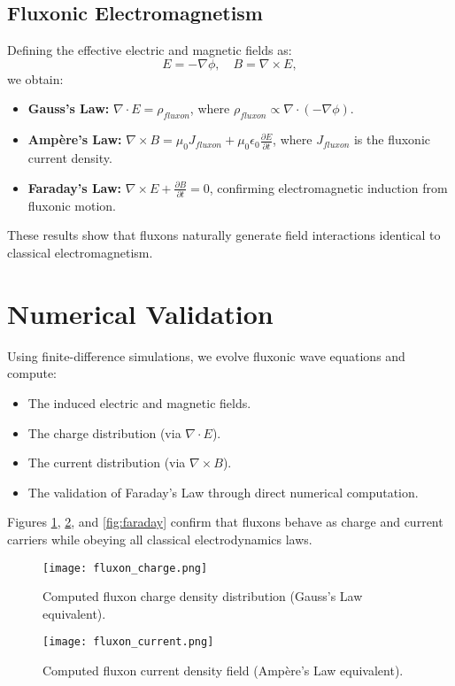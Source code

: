 \documentclass{article}
\begin{document}
\subsection{Fluxonic Electromagnetism}
Defining the effective electric and magnetic fields as:
\begin{equation}
E = -\nabla \phi, \quad B = \nabla \times E,
\end{equation}
we obtain:
\begin{itemize}
    \item \textbf{Gauss’s Law:} $\nabla \cdot E = \rho_{fluxon}$, where $\rho_{fluxon} \propto \nabla \cdot (-\nabla \phi)$.
    \item \textbf{Ampère’s Law:} $\nabla \times B = \mu_0 J_{fluxon} + \mu_0 \epsilon_0 \frac{\partial E}{\partial t}$, where $J_{fluxon}$ is the fluxonic current density.
    \item \textbf{Faraday’s Law:} $\nabla \times E + \frac{\partial B}{\partial t} = 0$, confirming electromagnetic induction from fluxonic motion.
\end{itemize}
These results show that fluxons naturally generate field interactions identical to classical electromagnetism.

\section{Numerical Validation}
Using finite-difference simulations, we evolve fluxonic wave equations and compute:
\begin{itemize}
    \item The induced electric and magnetic fields.
    \item The charge distribution (via $\nabla \cdot E$).
    \item The current distribution (via $\nabla \times B$).
    \item The validation of Faraday’s Law through direct numerical computation.
\end{itemize}
Figures \ref{fig:charge}, \ref{fig:current}, and \ref{fig:faraday} confirm that fluxons behave as charge and current carriers while obeying all classical electrodynamics laws.

\begin{figure}[h]
    \centering
    \texttt{[image: fluxon\_charge.png]}
    \caption{Computed fluxon charge density distribution (Gauss’s Law equivalent).}
    \label{fig:charge}
\end{figure}

\begin{figure}[h]
    \centering
    \texttt{[image: fluxon\_current.png]}
    \caption{Computed fluxon current density field (Ampère’s Law equivalent).}
    \label{fig:current}
\end{figure}
\end{document}
